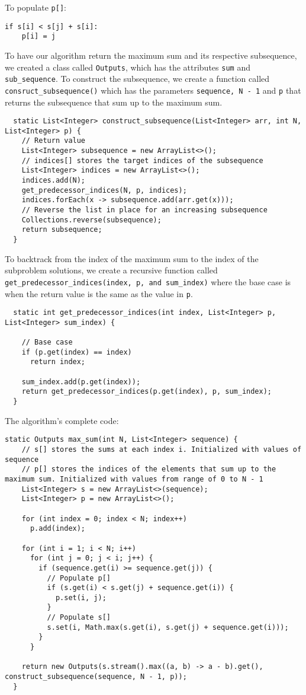 \documentclass[11pt]{article}
\begin{document}
To populate \lstinline{p[]}:
\begin{lstlisting}[frame=none]
  if s[i] < s[j] + s[i]:
    p[i] = j
\end{lstlisting}
\newpage
To have our algorithm return the maximum sum and its respective subsequence, we created a class called \lstinline{Outputs}, which has the attributes \lstinline{sum} and \lstinline{sub_sequence}.
To construct the subsequence, we create a function called \lstinline{consruct_subsequence()} which has the parameters \lstinline{sequence, N - 1} and \lstinline{p} that returns the subsequence that sum up to the maximum sum.
\begin{lstlisting}
  static List<Integer> construct_subsequence(List<Integer> arr, int N, List<Integer> p) {
    // Return value
    List<Integer> subsequence = new ArrayList<>();
    // indices[] stores the target indices of the subsequence
    List<Integer> indices = new ArrayList<>();
    indices.add(N);
    get_predecessor_indices(N, p, indices);
    indices.forEach(x -> subsequence.add(arr.get(x)));
    // Reverse the list in place for an increasing subsequence
    Collections.reverse(subsequence);
    return subsequence;
  }
\end{lstlisting}
To backtrack from the index of the maximum sum to the index of the subproblem solutions, we create a recursive function called \lstinline{get_predecessor_indices(index, p, and sum_index)} where the base case is when the return value is the same as the value in \lstinline{p}.
\begin{lstlisting}
  static int get_predecessor_indices(int index, List<Integer> p, List<Integer> sum_index) {

    // Base case
    if (p.get(index) == index)
      return index;

    sum_index.add(p.get(index));
    return get_predecessor_indices(p.get(index), p, sum_index);
  }
\end{lstlisting}
\newpage
The algorithm's complete code:
\begin{lstlisting}
static Outputs max_sum(int N, List<Integer> sequence) {
    // s[] stores the sums at each index i. Initialized with values of sequence
    // p[] stores the indices of the elements that sum up to the maximum sum. Initialized with values from range of 0 to N - 1
    List<Integer> s = new ArrayList<>(sequence);
    List<Integer> p = new ArrayList<>();

    for (int index = 0; index < N; index++)
      p.add(index);

    for (int i = 1; i < N; i++)
      for (int j = 0; j < i; j++) {
        if (sequence.get(i) >= sequence.get(j)) {
          // Populate p[]
          if (s.get(i) < s.get(j) + sequence.get(i)) {
            p.set(i, j);
          }
          // Populate s[]
          s.set(i, Math.max(s.get(i), s.get(j) + sequence.get(i)));
        }
      }

    return new Outputs(s.stream().max((a, b) -> a - b).get(), construct_subsequence(sequence, N - 1, p));
  }
\end{lstlisting}
\end{document}
